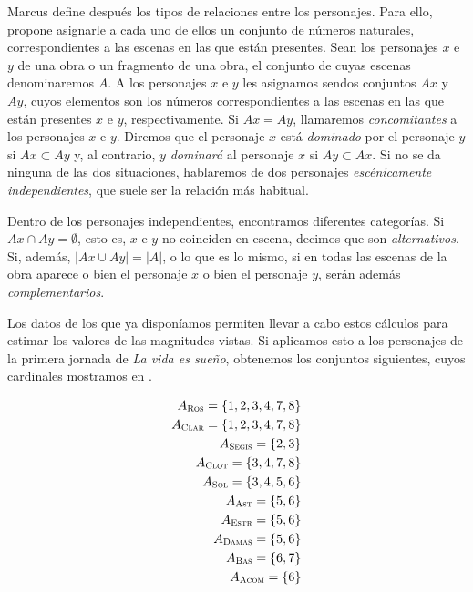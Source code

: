 

Marcus define después los tipos de relaciones entre los personajes. Para ello, propone asignarle a cada uno de ellos un conjunto de números naturales, correspondientes  a las escenas en las que están presentes. Sean los personajes $x$ e $y$ de una obra o un fragmento de una obra, el conjunto de cuyas escenas denominaremos $A$. A los personajes $x$ e $y$ les asignamos sendos conjuntos $Ax$ y $Ay$, cuyos elementos son los números correspondientes a las escenas en las que están presentes $x$ e $y$, respectivamente. Si $Ax = Ay$, llamaremos \textit{concomitantes} a los personajes  $x$ e $y$. Diremos que el personaje $x$ está \textit{dominado} por el personaje $y$ si  $Ax \subset Ay$ y, al contrario, $y$ \textit{dominará} al personaje $x$ si $Ay \subset Ax$. Si no se da ninguna de las dos situaciones, hablaremos de dos personajes \textit{escénicamente independientes}, que suele ser la relación más habitual.

Dentro de los personajes independientes, encontramos diferentes categorías. Si $Ax \cap Ay = \emptyset$, esto es, $x$ e $y$ no coinciden en escena, decimos que son \textit{alternativos}. Si, además, $\lvert Ax \cup Ay \rvert = \lvert A \rvert$, o lo que es lo mismo, si en todas las escenas de la obra aparece o bien el personaje $x$ o bien el personaje $y$, serán además \textit{complementarios}.

Los datos de los que ya disponíamos permiten llevar a cabo estos cálculos para estimar los valores de las magnitudes vistas. Si aplicamos esto a los personajes de la primera jornada de \textit{La vida es sueño}, obtenemos los conjuntos siguientes, cuyos cardinales mostramos en .

\begin{equation*}\begin{aligned} 
		A_{\textsc{Ros}} = \{1, 2, 3, 4, 7, 8\} \\
		A_{\textsc{Clar}} = \{1, 2, 3, 4, 7, 8\} \\
		A_{\textsc{Segis}} = \{2, 3\} \\
		A_{\textsc{Clot}} = \{3, 4, 7, 8\} \\
		A_{\textsc{Sol}} = \{3, 4, 5, 6\} \\
		A_{\textsc{Ast}} = \{5, 6\} \\
		A_{\textsc{Estr}} = \{5, 6\} \\
		A_{\textsc{Damas}} = \{5, 6\} \\
		A_{\textsc{Bas}} = \{6, 7\}		 \\		
		A_{\textsc{Acom}} = \{6\}
\end{aligned}\end{equation*}

